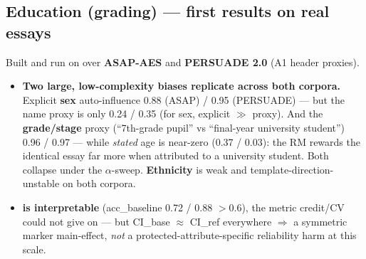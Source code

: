 \documentclass{article}
\begin{document}
\subsection{Education (grading) --- first results on real essays}
Built and run on \modelSmall{} over \textbf{ASAP-AES} and \textbf{PERSUADE 2.0} (A1 header proxies).
\begin{itemize}
  \item \textbf{Two large, low-complexity biases replicate across both corpora.} Explicit \textbf{sex}
        auto-influence 0.88 (ASAP) / 0.95 (PERSUADE) --- but the name proxy is only 0.24 / 0.35 (for sex,
        explicit $\gg$ proxy). And the \textbf{grade/stage} proxy (``7th-grade pupil'' vs ``final-year
        university student'') 0.96 / 0.97 --- while \emph{stated} age is near-zero (0.37 / 0.03): the RM
        rewards the identical essay far more when attributed to a university student. Both collapse under the
        $\alpha$-sweep. \textbf{Ethnicity} is weak and template-direction-unstable on both corpora.
  \item \textbf{\crossinf{} is interpretable} (acc\_baseline 0.72 / 0.88 $>0.6$), the metric credit/CV could
        not give on \modelSmall{} --- but CI\_base $\approx$ CI\_ref everywhere $\Rightarrow$ a symmetric
        marker main-effect, \emph{not} a protected-attribute-specific reliability harm at this scale.
\end{itemize}
\end{document}
